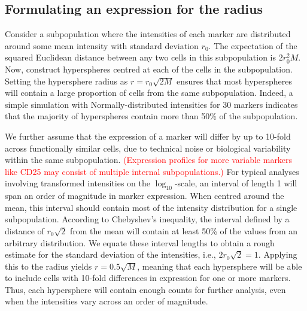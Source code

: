 \documentclass{article}
\newcommand\revised[1]{\textcolor{red}{#1}}
\begin{document}
\subsection{Formulating an expression for the radius}
Consider a subpopulation where the intensities of each marker are distributed around some mean intensity with standard deviation $r_0$.
The expectation of the squared Euclidean distance between any two cells in this subpopulation is $2r_0^2M$.
Now, construct hyperspheres centred at each of the cells in the subpopulation.
Setting the hypersphere radius as $r=r_0\sqrt{2M}$ ensures that most hyperspheres will contain a large proportion of cells from the same subpopulation.
Indeed, a simple simulation with Normally-distributed intensities for 30 markers indicates that the majority of hyperspheres contain more than 50\% of the subpopulation.


We further assume that the expression of a marker will differ by up to 10-fold across functionally similar cells, due to technical noise or biological variability within the same subpopulation.
\revised{(Expression profiles for more variable markers like CD25 may consist of multiple internal subpopulations.)}
For typical analyses involving transformed intensities on the $\log_{10}$-scale, an interval of length 1 will span an order of magnitude in marker expression.
When centred around the mean, this interval should contain most of the intensity distribution for a single subpopulation.
According to Chebyshev's inequality, the interval defined by a distance of $r_0\sqrt{2}$ from the mean will contain at least 50\% of the values from an arbitrary distribution.
We equate these interval lengths to obtain a rough estimate for the standard deviation of the intensities, i.e., $2r_0\sqrt{2} = 1$.
Applying this to the radius yields $r=0.5\sqrt{M}$, meaning that each hypersphere will be able to include cells with 10-fold differences in expression for one or more markers.
Thus, each hypersphere will contain enough counts for further analysis, even when the intensities vary across an order of magnitude.
\end{document}
